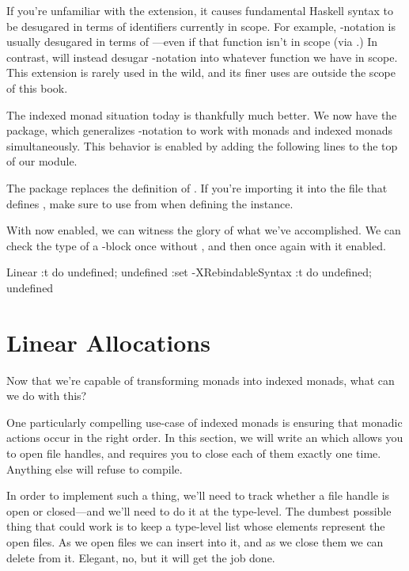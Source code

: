 \documentclass[book.tex]{subfiles}
\begin{document}
If you're unfamiliar with the  extension, it causes
fundamental Haskell syntax to be desugared in terms of identifiers currently in
scope. For example, -notation is usually desugared in terms of
---even if that function isn't in scope (via
.) In contrast,  will instead
desugar -notation into whatever \hs{(>>=)} function we have in scope.
This extension is rarely used in the wild, and its finer uses are outside the
scope of this book.

The indexed monad situation today is thankfully much better. We now have the
\cite{do-notation} package, which generalizes -notation
to work with monads and indexed monads simultaneously. This behavior is enabled
by adding the following lines to the top of our module.


\begin{warning}
  The  package replaces the definition of . If you're
  importing it into the file that defines , make sure to use 
  from  when defining the  instance.
\end{warning}

With  now enabled, we can witness the glory of what we've
accomplished. We can check the type of a -block once without
, and then once again with it enabled.

\begin{dorepl}{Linear}
:t do { undefined; undefined }
:set -XRebindableSyntax
:t do { undefined; undefined }
\end{dorepl}


\section{Linear Allocations}


Now that we're capable of transforming monads into indexed monads, what can we
do with this?

One particularly compelling use-case of indexed monads is ensuring that monadic
actions occur in the right order. In this section, we will write an 
which allows you to open file handles, and requires you to close each of them
exactly one time. Anything else will refuse to compile.

In order to implement such a thing, we'll need to track whether a file handle is
open or closed---and we'll need to do it at the type-level. The dumbest possible
thing that could work is to keep a type-level list whose elements represent the
open files. As we open files we can insert into it, and as we close them we can
delete from it. Elegant, no, but it will get the job done.
\end{document}
